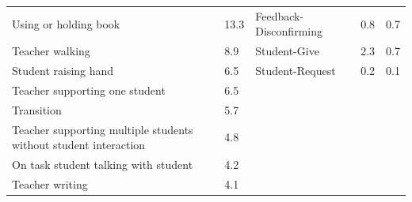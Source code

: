 \documentclass[11pt]{article}
\begin{document}
\begin{table}[htbp]
{\begin{tabular}{p{7cm}p{1cm}  p{5cm}p{1cm}p{1cm}}
    Using or holding book & 13.3 & Feedback-Disconfirming & 0.8 & 0.7 \\
    Teacher walking & 8.9 & Student-Give & 2.3 & 0.7 \\
    Student raising hand & 6.5 & Student-Request & 0.2 & 0.1 \\
    Teacher supporting one student & 6.5 & & & \\
    Transition & 5.7 & & & \\
    Teacher supporting multiple students without student interaction & 4.8 & & & \\
    On task student talking with student & 4.2 & & & \\
    Teacher writing & 4.1 & & & \\
    \bottomrule
    \end{tabular}
}
\end{table}
\end{document}
